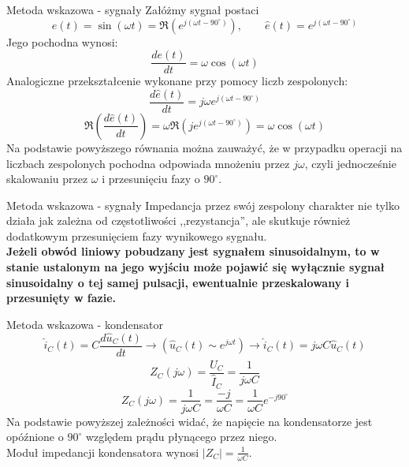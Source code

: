 \begin{frame}{Metoda wskazowa - sygnały}
	Załóżmy sygnał postaci
	\begin{equation*}
		e(t) = \sin(\omega t) = \Re\left(e^{j(\omega t - 90^{\circ})}\right), \qquad \hat{e}(t) = e^{j(\omega t - 90^{\circ})}
	\end{equation*}
	Jego pochodna wynosi:
	\begin{equation*}
		\frac{d e(t)}{dt} = \omega \cos(\omega t)
	\end{equation*}
	Analogiczne przekształcenie wykonane przy pomocy liczb zespolonych:
	\begin{equation*}
		\frac{d \hat{e}(t)}{dt} = j \omega e^{j(\omega t - 90^{\circ})}
	\end{equation*}
	\begin{equation*}
		\Re \left( \frac{d \hat{e}(t)}{dt} \right) = \omega \Re \left( j e^{j(\omega t - 90^{\circ})} \right) = \omega \cos(\omega t)
	\end{equation*}
	Na podstawie powyższego równania można zauważyć, że w przypadku operacji na liczbach zespolonych pochodna odpowiada mnożeniu przez $j\omega$, czyli jednocześnie skalowaniu przez $\omega$ i przesunięciu fazy o $90^{\circ}$.
\end{frame}

\begin{frame}{Metoda wskazowa - sygnały}
	Impedancja przez swój zespolony charakter nie tylko działa jak zależna od częstotliwości ,,rezystancja'', ale skutkuje również dodatkowym przesunięciem fazy wynikowego sygnału.\\
	\textbf{Jeżeli obwód liniowy pobudzany jest sygnałem sinusoidalnym, to w stanie ustalonym na jego wyjściu może pojawić się wyłącznie sygnał sinusoidalny o tej samej pulsacji, ewentualnie przeskalowany i przesunięty w fazie.}
\end{frame}

\begin{frame}{Metoda wskazowa - kondensator}
	\begin{equation*}
		\hat{i}_C(t) = C \frac{d \hat{u}_C(t)}{dt} \rightarrow \left( \hat{u}_C(t) \sim e^{j\omega t} \right) \rightarrow \hat{i}_C(t) = j \omega C \hat{u}_C(t)
	\end{equation*}
	\begin{equation*}
		Z_C(j \omega) = \frac{\hat{U}_C}{\hat{I}_C} = \frac{1}{j \omega C}
	\end{equation*}
	\begin{equation*}
		Z_C(j \omega) = \frac{1}{j \omega C} = \frac{-j}{\omega C} = \frac{1}{\omega C} e^{-j90^{\circ}}
	\end{equation*}
	Na podstawie powyższej zależności widać, że napięcie na kondensatorze jest opóźnione o $90^{\circ}$ względem prądu płynącego przez niego.\\
	Moduł impedancji kondensatora wynosi $\left| Z_C \right| = \frac{1}{\omega C}$.
\end{frame}

